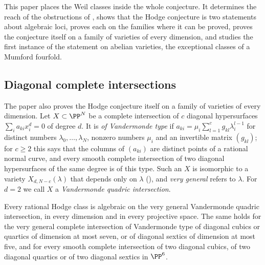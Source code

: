 This paper places the Weil classes inside the whole conjecture. It
determines the reach of the obstructions of \cite{paperI}, shows that the
Hodge conjecture is two statements about algebraic loci, proves each on the
families where it can be proved, proves the conjecture itself on a family of
varieties of every dimension, and studies the first instance of the
statement on abelian varieties, the exceptional classes of a Mumford
fourfold.

\subsection{Diagonal complete intersections}

The paper also proves the Hodge conjecture itself on a family of varieties
of every dimension. Let $X\subset\PP^{N}$ be a complete intersection of $c$
diagonal hypersurfaces $\sum_{i}a_{ki}x_{i}^{d}=0$ of degree $d$. It is
\emph{of Vandermonde type} if $a_{ki}=\mu_{i}\sum_{l=1}^{c}g_{kl}\lambda_{i}^{l-1}$
for distinct numbers $\lambda_{0},\dots,\lambda_{N}$, nonzero numbers
$\mu_{i}$ and an invertible matrix $(g_{kl})$; for $c\ge2$ this says that the
columns of $(a_{ki})$ are distinct points of a rational normal curve, and
every smooth complete intersection of two diagonal hypersurfaces of the same
degree is of this type. Such an $X$ is isomorphic to a variety
$X_{d,N-c}(\lambda)$ that depends only on $\lambda$ (),
and \emph{very general} refers to $\lambda$. For $d=2$ we call $X$ a
\emph{Vandermonde quadric intersection}.

\begin{theorem}\label{thm:introvandermonde}
Every rational Hodge class is algebraic on the very general Vandermonde
quadric intersection, in every dimension and in every projective space. The
same holds for the very general complete intersection of Vandermonde type of
diagonal cubics or quartics of dimension at most seven, or of diagonal
sextics of dimension at most five, and for every smooth complete
intersection of two diagonal cubics, of two diagonal quartics or of two
diagonal sextics in $\PP^{6}$.
\end{theorem}

